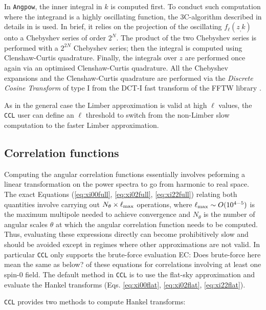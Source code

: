 \documentclass[\docopts]{\docclass}
\newcommand{\elisa}[1]{\textcolor{green!10!orange!90!}{EC: #1}}
\newcommand{\ccl}{{\tt CCL}\xspace}
\begin{document}
In \texttt{Angpow}, the inner integral in $k$ is computed first.
To conduct such computation where the integrand is a highly oscillating function, the 3C-algorithm described in details in \citet{2017A&A...602A..72C} is used. In brief, it relies on the projection of the oscillating $f_\ell(z_,k)$ onto a Chebyshev series of order $2^N$. The product of the two Chebyshev series is performed with a $2^{2N}$ Chebyshev series; then the integral is computed using Clenshaw-Curtis quadrature. Finally, the integrals over $z$ are performed once again via an optimised Clenshaw-Curtis quadrature. All the Chebyshev expansions and the Clenshaw-Curtis quadrature are performed via the \textit{Discrete Cosine Transform} of type I from the DCT-I fast transform of the FFTW library \citep{FFTW}.

As in the general case the Limber approximation is valid at high $\ell$ values, the \ccl user can define an $\ell$ threshold to switch from the non-Limber slow computation to the faster Limber approximation.
 


\subsection{Correlation functions}

Computing the angular correlation functions essentially involves peforming a linear transformation on the power spectra to go from harmonic to real space. The exact Equations (\ref{eq:xi00full}, \ref{eq:xi02full}, \ref{eq:xi22full}) relating both quantities involve carrying out $N_\theta\times\ell_{\rm max}$ operations, where $\ell_{\rm max}\sim O(10^{4-5})$ is the maximum multipole needed to achieve convergence and $N_\theta$ is the number of angular scales $\theta$ at which the angular correlation function needs to be computed. Thus, evaluating these expressions directly can become prohibitively slow and should be avoided except in regimes where other approximations are not valid. In particular \ccl only supports the brute-force evaluation \elisa{Does brute-force here mean the same as below?} of these equations for correlations involving at least one spin-0 field. The default method in \ccl is to use the flat-sky approximation and evaluate the Hankel transforms (Eqs. \ref{eq:xi00flat}, \ref{eq:xi02flat}, \ref{eq:xi22flat}).

\ccl provides two methods to compute Hankel transforms:
\end{document}
